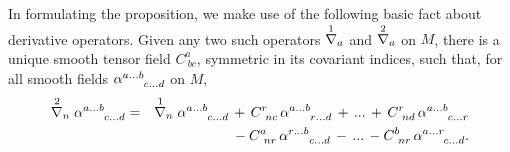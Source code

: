\documentclass [12] {article}
\theoremstyle{plain}
\numberwithin{figure}{subsection}
\numberwithin{proposition}{subsection}
\begin{document}
In formulating the proposition,  we make use of the following basic fact about derivative operators. Given any two such operators $\stackrel{1 \hspace{.5em}}{\nabla_a}$ and $\stackrel{2 \hspace{.5em}}{\nabla_a}$  on $M$, there is a unique smooth tensor field $C^a_{\ bc}$, symmetric in its covariant indices, such that, for all smooth fields  $\alpha^{a \ldots b}_{\hspace{1.5em} c \ldots d}$  on $M$,
\begin{eqnarray} 
\stackrel{2 \hspace{.5em}}{\nabla_n } \alpha^{a \ldots b}_{\hspace{1.5em} c \ldots d}&=&\stackrel{1 \hspace{.5em}}{\nabla_n } \alpha^{a \ldots b}_{\hspace{1.5em} c \ldots d} \, + \,  C^r_{\ nc} \,  \alpha^{a \ldots b}_{\hspace{1.5em} r \ldots d} \, 
+ \,  ...  \, + \, C^r_{\ nd} \,  \alpha^{a \ldots b}_{\hspace{1.5em} c \ldots r}  \nonumber  \\
&  & \hspace{2em} {} - C^a_{\ nr} \,  \alpha^{r \ldots b}_{\hspace{1.5em} c \ldots d} \, 
- \,  ...  \,  - C^b_{\ nr} \,  \alpha^{a \ldots r}_{\hspace{1.5em} c \ldots d}.      \label{C expansion}
\end{eqnarray}
\end{document}
